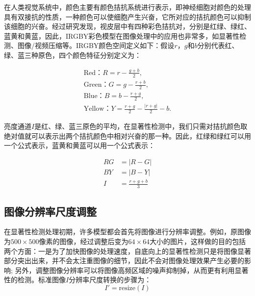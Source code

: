 在人类视觉系统中，颜色主要有颜色拮抗系统进行表示，即神经细胞对颜色的处理具有双接抗的性质，一种颜色可以使细胞产生兴奋，它所对应的拮抗颜色可以抑制该细胞的兴奋\cite{Engel1997Colour}。经过研究发现，视皮层中有四种彩色拮抗对，分别是红绿、绿红、蓝黄和黄蓝，因此，IRGBY彩色模型在图像处理中的应用也非常多，如显著性检测、图像/视频压缩等。IRGBY颜色空间定义如下：假设$r$，$g$和$b$分别代表红、绿、蓝三种原色，四个颜色特征分别定义为：
\begin{linenomath}
\begin{align}
\textrm{Red：$R=r-\frac{g+b}{2}$,}\label{式2_6}\\
\textrm{Green：$G=g-\frac{r+b}{2}$,}\label{式2_7}\\
\textrm{Blue：$B=b-\frac{r+g}{2}$,}\label{式2_8}\\
\textrm{Yellow：$Y=\frac{r+g}{2}-\frac{|r+g|}{2}-b$.}\label{式2_9}
\end{align}
\end{linenomath}
亮度通道$I$是红、绿、蓝三原色的平均，在显著性检测中，我们只需对拮抗颜色取绝对值就可以表示出两个拮抗颜色中相对兴奋的那一种。因此，红绿和绿红可以用一个公式表示，蓝黄和黄蓝可以用一个公式表示：
\begin{linenomath}
\begin{align}
RG &= \big|R-G\big|\label{式2_10}\\
BY &= \big|B-Y\big|\label{式2_11}\\
I &= \frac{r+g+b}{3}\label{式2_12}
\end{align}
\end{linenomath}

\subsection{图像分辨率尺度调整}
\label{2_1_4}

在显著性检测处理初期，许多模型都会首先将图像进行分辨率调整。例如，原图像为$500×500$像素的图像，经过调整后变为$64×64$大小的图片，这样做的目的\cite{ZhangLiming2010Book}包括两个方面：一是为了加快图像的处理速度，自底向上的显著性检测只是将图像显著部分突出出来，并不会太注重图像的细节，因此不会对图像处理效果产生必要的影响; 另外，调整图像分辨率可以将图像高频区域的噪声抑制掉，从而更有利用显著性的检测。标准图像$I$分辨率尺度转换的步骤为：
\begin{equation}
I'=\textrm{resize$(I)$}
\label{式2_13}
\end{equation}

